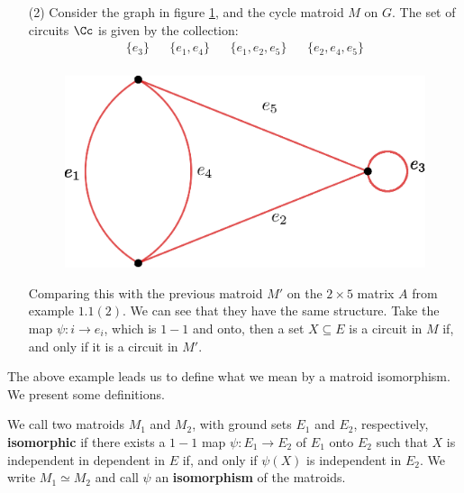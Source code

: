 \begin{example}
\begin{enumerate}
        \item[(2)] Consider the graph in figure \ref{fig_1.2}, and the cycle
            matroid $M$ on $G$. The set of circuits  $\Cc$ is given by the
            collection:
            \begin{align*}
                \{e_3\} && \{e_1,e_4\} && \{e_1, e_2, e_5\} && \{e_2,e_4,e_5\} \\
            \end{align*}
            \begin{figure}[h]
                \centering
                \includegraphics[scale=0.5]{Figures/Chapter1/graphic_matroid.eps}
                \caption{}
                \label{fig_1.2}
            \end{figure}
            Comparing this with the previous matroid $M'$ on the $2 \times 5$
            matrix $A$ from example $1.1(2)$. We can see that they have the same
            structure. Take the map $\psi:i \rightarrow e_i$, which is $1-1$ and
             onto, then a set  $X \subseteq E$ is a circuit in  $M$ if, and only
             if it is a circuit in $M'$.
    \end{enumerate}
\end{example}

The above example leads us to define what we mean by a matroid isomorphism. We
present some definitions.

\begin{definition}
    We call two matroids $M_1$ and $M_2$, with ground sets $E_1$ and $E_2$,
    respectively, \textbf{isomorphic} if there exists a $1-1$ map  $\psi:E_1
    \rightarrow E_2$ of $E_1$ onto $E_2$ such that $X$ is independent in
    dependent in $E$ if, and only if  $\psi(X)$ is independent in $E_2$. We
    write $M_1 \simeq M_2$ and call $\psi$ an  \textbf{isomorphism} of the
    matroids.
\end{definition}

